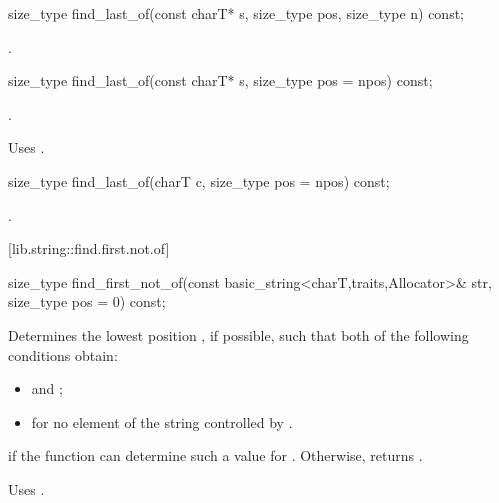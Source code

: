 %
%
\begin{itemdecl}
size_type find_last_of(const charT* s, size_type pos, size_type n) const;
\end{itemdecl}

\begin{itemdescr}
\pnum
\returns
{}.
\end{itemdescr}

%
%
\begin{itemdecl}
size_type find_last_of(const charT* s, size_type pos = npos) const;
\end{itemdecl}

\begin{itemdescr}
\pnum
\returns
{}.

\pnum
\notes
Uses .
\end{itemdescr}

%
%
\begin{itemdecl}
size_type find_last_of(charT c, size_type pos = npos) const;
\end{itemdecl}

\begin{itemdescr}
\pnum
\returns
{}.
\end{itemdescr}

[lib.string::find.first.not.of]{}

%
%
\begin{itemdecl}
size_type
  find_first_not_of(const basic_string<charT,traits,Allocator>& str,
                    size_type pos = 0) const;
\end{itemdecl}

\begin{itemdescr}
\pnum
\effects
Determines the lowest position , if possible, such that both of
the following conditions obtain:

\begin{itemize}
\item
{}
and
;
\item
{}%
for no element  of the string controlled by .
\end{itemize}

\pnum
\returns
{} if the function can determine such a value for .
Otherwise, returns
.

\pnum
\notes
Uses
.
\end{itemdescr}

